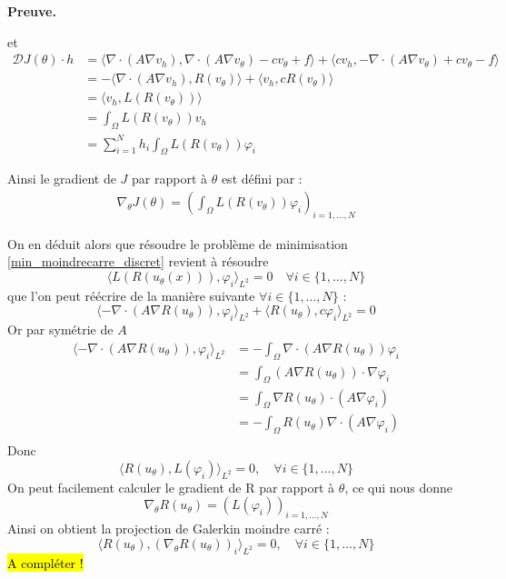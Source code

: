 \documentclass[french]{article}
\newenvironment{preuve}[1][]{\begin{tcolorbox}[
	colback=white, %
	colframe=green!70!black, %
	arc=2mm, %
	boxrule=1pt, %
	breakable, enhanced jigsaw
	]
	\textcolor{green!70!black}{\textbf{Preuve.} \\}

	#1
}{\end{tcolorbox}}
\begin{document}
\begin{itemize}[label=]
\begin{preuve}
			et
			\begin{align*}
				\mathcal{D}J(\theta)\cdot h &= \langle \nabla\cdot(A\nabla v_h), \nabla\cdot(A\nabla v_\theta) - cv_\theta +f \rangle+\langle cv_h, -\nabla\cdot(A\nabla v_\theta) + cv_\theta - f \rangle \\ 
				&= -\langle \nabla\cdot(A\nabla v_h), R(v_\theta) \rangle+\langle v_h, cR(v_\theta)\rangle \\ 
				&= \langle v_h, L(R(v_\theta)) \rangle \\
				&=\int_\Omega L(R(v_\theta))v_h \\
				&=\sum_{i=1}^N h_i\int_\Omega L(R(v_\theta))\varphi_i
			\end{align*}
			
			Ainsi le gradient de $J$ par rapport à $\theta$ est défini par :
			\begin{align*}
				\nabla_\theta J(\theta) = \left(\int_\Omega L(R(v_\theta))\varphi_i\right)_{i=1,\dots,N}
			\end{align*}
			
			On en déduit alors que résoudre le problème de minimisation \eqref{min_moindrecarre_discret} revient à résoudre
			\begin{equation*}
				\langle L(R(u_\theta(x))), \varphi_i\rangle_{L^2} = 0 \quad \forall i \in \{1,\dots,N\}
			\end{equation*}
			que l'on peut réécrire de la manière suivante $\forall i \in \{1,\dots,N\}$ :
			\begin{equation*}
				\langle -\nabla\cdot(A\nabla R(u_\theta)), \varphi_i\rangle_{L^2}+\langle R(u_\theta), c\varphi_i\rangle_{L^2} = 0
			\end{equation*}
			Or par symétrie de $A$
			\begin{align*}
				\langle -\nabla\cdot(A\nabla R(u_\theta)), \varphi_i\rangle_{L^2} &= -\int_\Omega \nabla\cdot(A\nabla R(u_\theta))\varphi_i \\
				&=\int_\Omega (A\nabla R(u_\theta))\cdot\nabla\varphi_i \\
				&=\int_\Omega \nabla R(u_\theta)\cdot(A\nabla\varphi_i) \\
				&=-\int_\Omega R(u_\theta)\nabla\cdot(A\nabla\varphi_i) \\
			\end{align*}
			Donc
			\begin{equation*}
				\langle R(u_\theta), L(\varphi_i)\rangle_{L^2} = 0, \quad \forall i \in \{1,\dots,N\}
			\end{equation*}
			On peut facilement calculer le gradient de R par rapport à $\theta$, ce qui nous donne
			\begin{equation*}
				\nabla_\theta R(u_\theta)=(L(\varphi_i))_{i=1,\dots,N}
			\end{equation*}
			Ainsi on obtient la projection de Galerkin moindre carré :
			\begin{equation*}
				\langle R(u_\theta), (\nabla_\theta R(u_\theta))_i\rangle_{L^2} = 0, \quad \forall i \in \{1,\dots,N\}
			\end{equation*}
			\hl{A compléter !}
		\end{preuve}	
	\end{itemize}
\end{document}
